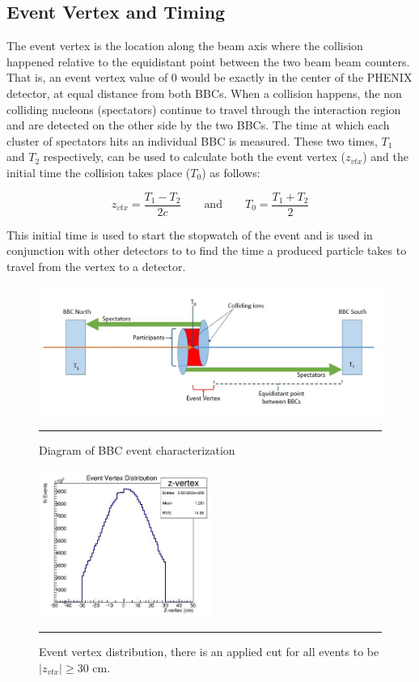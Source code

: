 \subsection{Event Vertex and Timing}
\label{sect:timeandvtx}
The event vertex is the location along the beam axis where the collision happened relative to the equidistant point between the two beam beam counters. That is, an event vertex value of 0 would be exactly in the center of the PHENIX detector, at equal distance from both BBCs. When a collision happens, the non colliding nucleons (spectators) continue to travel through the interaction region and are detected on the other side by the two BBCs. The time at which each cluster of spectators hits an individual BBC is measured. These two times, $T_1$ and $T_2$ respectively, can be used to calculate both the event vertex ($z_{vtx}$) and the initial time the collision takes place ($T_0$) as follows\citep{Mitchell:2002wu}:

\begin{equation}
 z_{vtx} = \frac{T_1 - T_2}{2c} \qquad\text{and}\qquad T_0 = \frac{T_1 + T_2}{2}
\end{equation}

This initial time is used to start the stopwatch of the event and is used in conjunction with other detectors to to find the time a produced particle takes to travel from the vertex to a detector.

\begin{figure}[htbp!]
  \centering
    \includegraphics[width=1\textwidth]{Figures/BBCevtchar.JPG}
    \rule{35em}{0.5pt}
  \caption[Diagram of BBC event characterization]{Diagram of BBC event characterization}
  \label{fig:bbcvtx}
\end{figure}


\begin{figure}[htbp!]
  \centering
    \includegraphics[width=0.5\textwidth]{evtQA/zvtxdist.JPG}
    \rule{35em}{0.5pt}
  \caption[Event Vertex Distribution]{Event vertex distribution, there is an applied cut for all events to be $|z_{vtx}| \geq 30$ cm.}
  \label{fig:vtxdist}
\end{figure}

